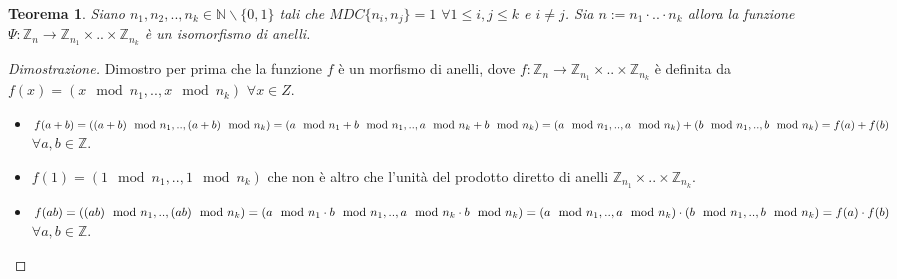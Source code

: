 \documentclass{article}
\theoremstyle{definition}
\theoremstyle{plain}
\theoremstyle{plain}
\theoremstyle{plain}
\newtheorem{teorema}{Teorema}
\theoremstyle{plain}
\begin{document}
\begin{teorema}\label{teo:TCR}
    Siano $n_1, n_2, .., n_k \in \mathbb{N}\backslash\{0, 1\}$ tali che $MDC\{n_i, n_j\} = 1$ $\forall 1 \le i, j \le k$ e $i \neq j$. Sia $n:= n_1 \cdot .. \cdot n_k$ allora la funzione $\Psi : \mathbb{Z}_n \rightarrow \mathbb{Z}_{n_1} \times .. \times \mathbb{Z}_{n_k}$ è un isomorfismo di anelli.
\end{teorema}
\begin{proof}[Dimostrazione]
    Dimostro per prima che la funzione $f$ è un morfismo di anelli, dove $f :  \mathbb{Z}_n \rightarrow \mathbb{Z}_{n_1} \times .. \times \mathbb{Z}_{n_k}$ è definita da $f(x) = (x \mod n_1, .., x \mod n_k)$ $\forall x \in Z$.
    \begin{itemize}
        \item $f(a + b) = ((a + b) \mod n_1, .., (a + b) \mod n_k) = \\ (a \mod n_1 + b \mod n_1, .., a \mod n_k + b \mod n_k) = \\
        (a \mod n_1, .., a \mod n_k) + (b \mod n_1, .., b \mod n_k) = \\
        f(a) + f(b)$ $\forall a, b \in \mathbb{Z}$.
        \item $f(1) = (1 \mod n_1, .., 1 \mod n_k)$ che non è altro che l'unità del prodotto diretto di anelli  $\mathbb{Z}_{n_1} \times .. \times \mathbb{Z}_{n_k}$.
        \item $f(ab) = ((ab) \mod n_1, .., (ab) \mod n_k) = \\ (a \mod n_1 \cdot b \mod n_1, .., a \mod n_k \cdot b \mod n_k) = \\
        (a \mod n_1, .., a \mod n_k) \cdot (b \mod n_1, .., b \mod n_k) = \\
        f(a) \cdot f(b)$ $\forall a, b \in \mathbb{Z}$.
    \end{itemize}


\end{proof}
\end{document}
